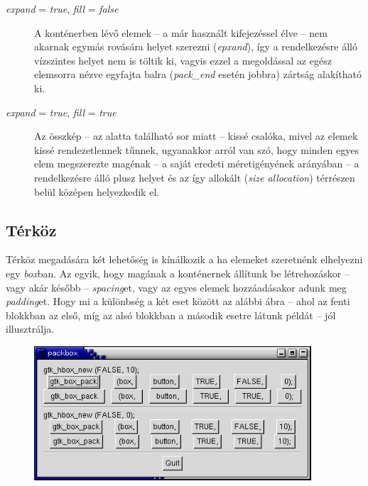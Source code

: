 \documentclass[a4paper,10pt]{article}
\begin{document}
\begin{description}
 \item[\textit{expand} = \textit{true}, \textit{fill} = \textit{false}] A konténerben lévő elemek -- a már használt kifejezéssel élve -- nem akarnak egymás rovására helyet szerezni (\textit{epxand}), így a rendelkezésre álló vízszintes helyet nem is töltik ki, vagyis ezzel a megoldással az egész elemsorra nézve egyfajta balra (\textit{pack\_end} esetén jobbra) zártság alakítható ki.

 \item[\textit{expand} = \textit{true}, \textit{fill} = \textit{true}] Az összkép -- az alatta található sor miatt -- kissé csalóka, mivel az elemek kissé rendezetlennek tűnnek, ugyanakkor arról van szó, hogy minden egyes elem megszerezte magénak -- a saját eredeti méretigényének arányában -- a rendelkezésre álló plusz helyet és az így allokált (\textit{size allocation}) térrészen belül középen helyezkedik el.
\end{description}

\subsection{Térköz}

Térköz megadására két lehetőség is kínálkozik a ha elemeket szeretnénk elhelyezni egy \textit{box}ban. Az egyik, hogy magának a konténernek állítunk be létrehozáskor -- vagy akár később -- \textit{spacing}et, vagy az egyes elemek hozzáadásakor adunk meg \textit{padding}et. Hogy mi a különbség a két eset között az alábbi ábra -- ahol az fenti blokkban az első, míg az alsó blokkban a második esetre látunk példát -- jól illusztrálja.

\vspace{12 pt}
\begin{figure}[H]
\begin{center}
\includegraphics[height=50mm]{packbox2.png}
\end{center}
\end{figure}
\end{document}
